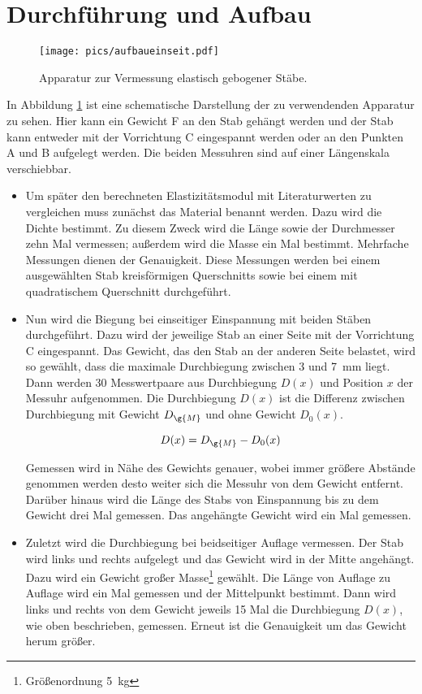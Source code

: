 \section{Durchführung und Aufbau}
\label{sec:Durchführung}

\begin{figure}[h]
  \centering
  \texttt{[image: pics/aufbaueinseit.pdf]}
  \caption{Apparatur zur Vermessung elastisch gebogener Stäbe\cite{anleitung}.}
  \label{fig:aufbau}
\end{figure}

In Abbildung \ref{fig:aufbau} ist eine schematische Darstellung der zu
verwendenden Apparatur zu sehen. Hier kann ein Gewicht F an den Stab gehängt
werden und der Stab kann entweder mit der Vorrichtung C eingespannt werden oder
an den Punkten A und B aufgelegt werden. Die beiden Messuhren sind auf einer
Längenskala verschiebbar.

\begin{itemize}
  \item Um später den berechneten Elastizitätsmodul mit Literaturwerten zu
  vergleichen muss zunächst das Material benannt werden.
  Dazu wird die Dichte bestimmt. Zu diesem Zweck wird die Länge sowie der
  Durchmesser zehn Mal vermessen; außerdem wird die Masse ein Mal bestimmt.
  Mehrfache Messungen dienen der Genauigkeit.
  Diese Messungen werden bei einem ausgewählten Stab kreisförmigen
  Querschnitts sowie bei einem mit quadratischem Querschnitt durchgeführt.

  \item Nun wird die Biegung bei einseitiger Einspannung mit beiden
  Stäben durchgeführt. Dazu wird der jeweilige Stab an einer Seite mit der
  Vorrichtung C eingespannt. Das Gewicht, das den Stab an der anderen
  Seite belastet, wird so gewählt, dass die maximale Durchbiegung zwischen
  3 und \SI{7}{\milli\meter} liegt.
  Dann werden 30 Messwertpaare aus Durchbiegung $D(x)$ und Position $x$ der Messuhr
  aufgenommen. Die Durchbiegung $D(x)$ ist die Differenz zwischen
  Durchbiegung mit Gewicht $D_{\g{M}}$ und ohne Gewicht $D_0(x)$.

  \begin{equation*}
    D(x) = D_{\g{M}} - D_0(x)
  \end{equation*}

  Gemessen wird in Nähe des Gewichts genauer, wobei immer größere Abstände
  genommen werden desto weiter sich die Messuhr von dem Gewicht entfernt.
  Darüber hinaus wird die Länge des Stabs von Einspannung bis zu dem
  Gewicht drei Mal gemessen. Das angehängte Gewicht wird ein Mal gemessen.

  \item Zuletzt wird die Durchbiegung bei beidseitiger Auflage vermessen.
  Der Stab wird links und rechts aufgelegt und das Gewicht wird in der Mitte
  angehängt. Dazu wird ein Gewicht großer Masse\footnote{Größenordnung \SI{5}{\kilo\gram}}
   gewählt. Die Länge
  von Auflage zu Auflage wird ein Mal gemessen und der Mittelpunkt
  bestimmt. Dann wird links und rechts von dem Gewicht jeweils 15 Mal
  die Durchbiegung $D(x)$, wie oben beschrieben, gemessen. Erneut ist
  die Genauigkeit um das Gewicht herum größer.


\end{itemize}
